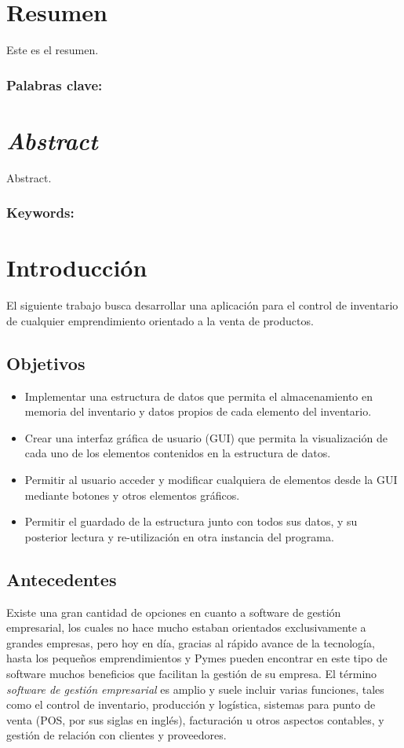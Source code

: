 \documentclass[10pt, a4paper]{article}
\begin{document}
\doublespacing


\section*{Resumen}
Este es el resumen.

\subsubsection*{Palabras clave:}
\section*{\emph{Abstract}}
Abstract.
\subsubsection*{Keywords:}

\section{Introducción}
El siguiente trabajo busca desarrollar una aplicación para el control de inventario de cualquier emprendimiento orientado a la venta de productos.
\subsection*{Objetivos}
\begin{itemize}
	\item Implementar una estructura de datos que permita el almacenamiento en memoria del inventario y datos propios de cada elemento del inventario.
	\item Crear una interfaz gráfica de usuario (GUI) que permita la visualización de cada uno de los elementos contenidos en la estructura de datos.
	\item Permitir al usuario acceder y modificar cualquiera de elementos desde la GUI mediante botones y otros elementos gráficos.
	\item Permitir el guardado de la estructura junto con todos sus datos, y su posterior lectura y re-utilización en otra instancia del programa.
\end{itemize}
\subsection*{Antecedentes}
Existe una gran cantidad de opciones en cuanto a software de gestión empresarial, los cuales no hace mucho estaban orientados exclusivamente a grandes empresas, pero hoy en día, gracias al rápido avance de la tecnología, hasta los pequeños emprendimientos y Pymes pueden encontrar en este tipo de software muchos beneficios que facilitan la gestión de su empresa.
El término \textit{software de gestión empresarial} es amplio y suele incluir varias funciones, tales como el control de inventario, producción y logística, sistemas para punto de venta (POS, por sus siglas en inglés), facturación u otros aspectos contables, y gestión de relación con clientes y proveedores. 
\end{document}
